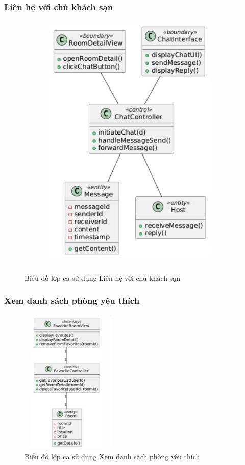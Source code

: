 \subsubsection{Liên hệ với chủ khách sạn}
\begin{figure}[H]
    \centering
    \includegraphics[width=\textwidth]{img2.2/ntin.jpg}
    \caption{Biểu đồ lớp ca sử dụng Liên hệ với chủ khách sạn}
\end{figure}

\subsubsection{Xem danh sách phòng yêu thích}
\begin{figure}[H]
    \centering
    \includegraphics[width=0.4\textwidth]{img2.2/yeuthich.jpg}
    \caption{Biểu đồ lớp ca sử dụng Xem danh sách phòng yêu thích}
\end{figure}

